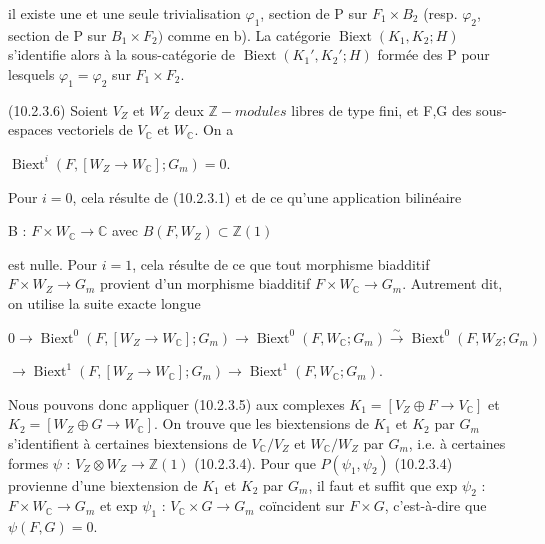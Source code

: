 \documentclass[11pt,twoside]{article}
\newcommand{\DFormula}[1]{%
  \par\smallskip\noindent\hspace*{0pt}\(\displaystyle #1\)\par\smallskip
}
\begin{document}
il existe une et une seule trivialisation \(\varphi _{1}\), section de P sur \(F_{1}\times B_{2}\) (resp. \(\varphi _{2}\), section de P sur \(B_{1}\times F_{2})\) comme en b). La catégorie \(\operatorname{Biext}(K_{1},K_{2};H)\) s’identifie alors à la sous-catégorie de \(\operatorname{Biext}(K_{1}′,K_{2}′;H)\) formée des P pour lesquels \(\varphi _{1}=\varphi _{2}\) sur \(F_{1}\times F_{2}\).\par
\par\medskip
(10.2.3.6) Soient \(V_{Z}\) et \(W_{Z}\) deux \(\mathbb{Z}-modules\) libres de type fini, et F,G des sous-espaces vectoriels de \(V_{\mathbb{C}}\) et \(W_{\mathbb{C}}\). On a\par
\par\medskip
\DFormula{\operatorname{Biext}^{i}(F,[W_{Z}\to W_{\mathbb{C}}];G_{m})=0.}
\par\medskip
Pour \(i=0\), cela résulte de (10.2.3.1) et de ce qu’une application bilinéaire\par
\par\medskip
B : \(F\times W_{\mathbb{C}}\to \mathbb{C}\)     avec     \(B(F,W_{Z})\subset \mathbb{Z}(1)\)\par
\par\medskip
est nulle. Pour \(i=1\), cela résulte de ce que tout morphisme biadditif \(F\times W_{Z}\to G_{m}\) provient d’un morphisme biadditif \(F\times W_{\mathbb{C}}\to G_{m}\). Autrement dit, on utilise la suite exacte longue\par
\par\medskip
\DFormula{0\to \operatorname{Biext}^{0}(F,[W_{Z}\to W_{\mathbb{C}}];G_{m})\to \operatorname{Biext}^{0}(F,W_{\mathbb{C}};G_{m})\xrightarrow{\sim}\operatorname{Biext}^{0}(F,W_{Z};G_{m})}
\DFormula{\to \operatorname{Biext}^{1}(F,[W_{Z}\to W_{\mathbb{C}}];G_{m})\to \operatorname{Biext}^{1}(F,W_{\mathbb{C}};G_{m}).}
\par\medskip
Nous pouvons donc appliquer (10.2.3.5) aux complexes \(K_{1}=[V_{Z}\oplus F\to V_{\mathbb{C}}]\) et \(K_{2}=[W_{Z}\oplus G\to W_{\mathbb{C}}]\). On trouve que les biextensions de \(K_{1}\) et \(K_{2}\) par \(G_{m}\) s’identifient à certaines biextensions de \(V_{\mathbb{C}}/V_{Z}\) et \(W_{\mathbb{C}}/W_{Z}\) par \(G_{m}\), i.e. à certaines formes \(\psi \) : \(V_{Z}\otimes W_{Z}\to \mathbb{Z}(1)\) (10.2.3.4). Pour que \(P(\psi _{1},\psi _{2})\) (10.2.3.4) provienne d’une biextension de \(K_{1}\) et \(K_{2}\) par \(G_{m}\), il faut et suffit que exp \(\psi _{2}\) : \(F\times W_{\mathbb{C}}\to G_{m}\) et exp \(\psi _{1}\) : \(V_{\mathbb{C}}\times G\to G_{m}\) coïncident sur \(F\times G\), c’est-à-dire que \(\psi (F,G)=0\).\par
\end{document}
